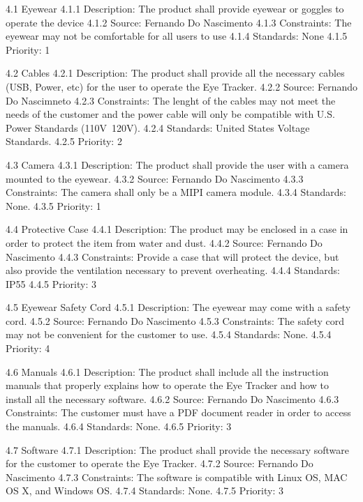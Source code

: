 4.1 Eyewear
	4.1.1 Description: The product shall provide eyewear or goggles to operate the device
	4.1.2 Source: Fernando Do Nascimento
	4.1.3 Constraints: The eyewear may not be comfortable for all users to use
	4.1.4 Standards: None
	4.1.5 Priority: 1

4.2 Cables
	4.2.1 Description: The product shall provide all the necessary cables (USB, Power, etc) for the user to operate the Eye Tracker.
	4.2.2 Source: Fernando Do Nascimneto
	4.2.3 Constraints: The lenght of the cables may not meet the needs of the customer and the power cable will only be compatible with U.S. Power Standards (110V~120V).
	4.2.4 Standards: United States Voltage Standards.
	4.2.5 Priority: 2
	
4.3 Camera
	4.3.1 Description: The product shall provide the user with a camera mounted to the eyewear.
	4.3.2 Source: Fernando Do Nascimento
	4.3.3 Constraints: The camera shall only be a MIPI camera module.
	4.3.4 Standards: None.
	4.3.5 Priority: 1
	
4.4 Protective Case
	4.4.1 Description: The product may be enclosed in a case in order to protect the item from water and dust.
	4.4.2 Source: Fernando Do Nascimento
	4.4.3 Constraints: Provide a case that will protect the device, but also provide the ventilation necessary to prevent overheating.
	4.4.4 Standards: IP55
	4.4.5 Priority: 3
	
4.5 Eyewear Safety Cord
	4.5.1 Description: The eyewear may come with a safety cord.
	4.5.2 Source: Fernando Do Nascimento
	4.5.3 Constraints: The safety cord may not be convenient for the customer to use.
	4.5.4 Standards: None.
	4.5.4 Priority: 4
	
4.6 Manuals
	4.6.1 Description: The product shall include all the instruction manuals that properly explains how to operate the Eye Tracker and how to install all the necessary software.
	4.6.2 Source: Fernando Do Nascimento
	4.6.3 Constraints: The customer must have a PDF document reader in order to access the manuals.
	4.6.4 Standards: None.
	4.6.5 Priority: 3

4.7 Software
	4.7.1 Description: The product shall provide the necessary software for the customer to operate the Eye Tracker.
	4.7.2 Source: Fernando Do Nascimento
	4.7.3 Constraints: The software is compatible with Linux OS, MAC OS X, and Windows OS.
	4.7.4 Standards: None.
	4.7.5 Priority: 3
